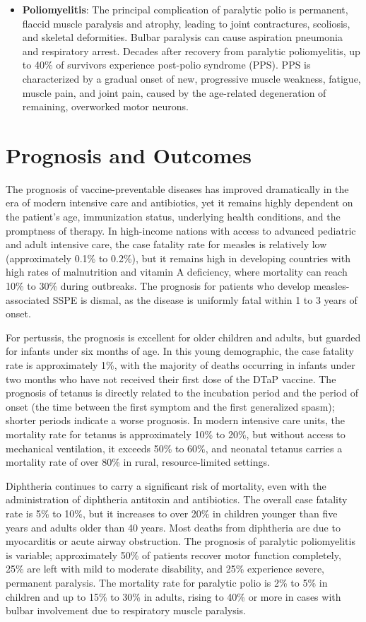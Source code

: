 \begin{itemize}
    \item \textbf{Poliomyelitis}: The principal complication of paralytic polio is permanent, flaccid muscle paralysis and atrophy, leading to joint contractures, scoliosis, and skeletal deformities. Bulbar paralysis can cause aspiration pneumonia and respiratory arrest. Decades after recovery from paralytic poliomyelitis, up to 40\% of survivors experience post-polio syndrome (PPS). PPS is characterized by a gradual onset of new, progressive muscle weakness, fatigue, muscle pain, and joint pain, caused by the age-related degeneration of remaining, overworked motor neurons.
\end{itemize}

\section*{Prognosis and Outcomes}
The prognosis of vaccine-preventable diseases has improved dramatically in the era of modern intensive care and antibiotics, yet it remains highly dependent on the patient's age, immunization status, underlying health conditions, and the promptness of therapy.
In high-income nations with access to advanced pediatric and adult intensive care, the case fatality rate for measles is relatively low (approximately 0.1\% to 0.2\%), but it remains high in developing countries with high rates of malnutrition and vitamin A deficiency, where mortality can reach 10\% to 30\% during outbreaks. The prognosis for patients who develop measles-associated SSPE is dismal, as the disease is uniformly fatal within 1 to 3 years of onset.

For pertussis, the prognosis is excellent for older children and adults, but guarded for infants under six months of age. In this young demographic, the case fatality rate is approximately 1\%, with the majority of deaths occurring in infants under two months who have not received their first dose of the DTaP vaccine. The prognosis of tetanus is directly related to the incubation period and the period of onset (the time between the first symptom and the first generalized spasm); shorter periods indicate a worse prognosis. In modern intensive care units, the mortality rate for tetanus is approximately 10\% to 20\%, but without access to mechanical ventilation, it exceeds 50\% to 60\%, and neonatal tetanus carries a mortality rate of over 80\% in rural, resource-limited settings.

Diphtheria continues to carry a significant risk of mortality, even with the administration of diphtheria antitoxin and antibiotics. The overall case fatality rate is 5\% to 10\%, but it increases to over 20\% in children younger than five years and adults older than 40 years. Most deaths from diphtheria are due to myocarditis or acute airway obstruction. The prognosis of paralytic poliomyelitis is variable; approximately 50\% of patients recover motor function completely, 25\% are left with mild to moderate disability, and 25\% experience severe, permanent paralysis. The mortality rate for paralytic polio is 2\% to 5\% in children and up to 15\% to 30\% in adults, rising to 40\% or more in cases with bulbar involvement due to respiratory muscle paralysis.

